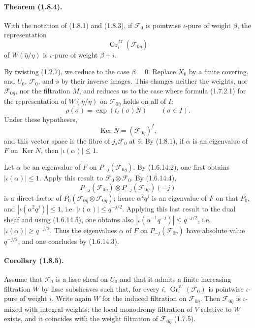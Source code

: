 \documentclass[11pt]{article}
\theoremstyle{remark}
\newcommand{\Gr}{\operatorname{Gr}}
\newcommand{\Ker}{\operatorname{Ker}}
\begin{document}
\paragraph{Theorem (1.8.4).}
With the notation of (1.8.1) and (1.8.3), if $\mathcal F_0$ is pointwise $\iota$-pure of weight $\beta$, the representation
\[
\Gr^M_i(\mathcal F_{0\bar\eta})
\]
of $W(\bar\eta/\eta)$ is $\iota$-pure of weight $\beta+i$.

By twisting (1.2.7), we reduce to the case $\beta=0$. Replace $X_0$ by a finite covering, and $U_0$, $\mathcal F_0$, and $s$ by their inverse images. This changes neither the weights, nor $\mathcal F_{0\bar\eta}$, nor the filtration $M$, and reduces us to the case where formula (1.7.2.1) for the representation of $W(\bar\eta/\eta)$ on $\mathcal F_{0\bar\eta}$ holds on all of $I$:
\[
\rho(\sigma)=\exp(t_\ell(\sigma)N)\qquad(\sigma\in I).
\]
Under these hypotheses,
\[
\Ker N=(\mathcal F_{0\bar\eta})^I,
\]
and this vector space is the fibre of $j_*\mathcal F_0$ at $\bar s$. By (1.8.1), if $\alpha$ is an eigenvalue of $F$ on $\Ker N$, then $|\iota(\alpha)|\le 1$.

Let $\alpha$ be an eigenvalue of $F$ on $P_{-j}(\mathcal F_{0\bar\eta})$. By (1.6.14.2), one first obtains $|\iota(\alpha)|\le1$. Apply this result to $\mathcal F_0\otimes\mathcal F_0$. By (1.6.14.4),
\[
P_{-j}(\mathcal F_{0\bar\eta})\otimes P_{-j}(\mathcal F_{0\bar\eta})(-j)
\]
is a direct factor of $P_0(\mathcal F_{0\bar\eta}\otimes\mathcal F_{0\bar\eta})$; hence $\alpha^2 q^j$ is an eigenvalue of $F$ on that $P_0$, and $|\iota(\alpha^2 q^j)|\le1$, i.e. $|\iota(\alpha)|\le q^{-j/2}$. Applying this last result to the dual sheaf and using (1.6.14.5), one obtains also $|\iota(\alpha^{-1}q^{-j})|\le q^{-j/2}$, i.e. $|\iota(\alpha)|\ge q^{-j/2}$. Thus the eigenvalues $\alpha$ of $F$ on $P_{-j}(\mathcal F_{0\bar\eta})$ have absolute value $q^{-j/2}$, and one concludes by (1.6.14.3).

\paragraph{Corollary (1.8.5).}
Assume that $\mathcal F_0$ is a lisse sheaf on $U_0$ and that it admits a finite increasing filtration $W$ by lisse subsheaves such that, for every $i$, $\Gr^W_i(\mathcal F_0)$ is pointwise $\iota$-pure of weight $i$. Write again $W$ for the induced filtration on $\mathcal F_{0\bar\eta}$. Then $\mathcal F_{0\bar\eta}$ is $\iota$-mixed with integral weights; the local monodromy filtration of $V$ relative to $W$ exists, and it coincides with the weight filtration of $\mathcal F_{0\bar\eta}$ (1.7.5).
\end{document}
